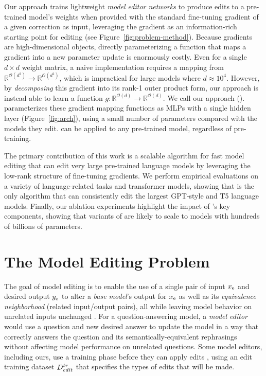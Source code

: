 \documentclass{article}
\begin{document}
Our approach trains lightweight \textit{model editor networks} to produce edits to a pre-trained model's weights when provided with the standard fine-tuning gradient of a given correction as input, leveraging the gradient as an information-rich starting point for editing (see Figure~\ref{fig:problem-method}). Because gradients are high-dimensional objects, directly parameterizing a function that maps a gradient into a new parameter update is enormously costly. Even for a single $d \times d$ weight matrix, a naive implementation requires a mapping from $\mathbb{R}^{\mathcal{O}(d^2)} \rightarrow \mathbb{R}^{\mathcal{O}(d^2)}$, which is impractical for large models where $d\approx 10^4$. However, by \textit{decomposing} this gradient into its rank-1 outer product form, our approach is instead able to learn a function $g:\mathbb{R}^{\mathcal{O}(d)} \rightarrow \mathbb{R}^{\mathcal{O}(d)}$. We call our approach {\fullname} (\name). {\name} parameterizes these gradient mapping functions as MLPs with a single hidden layer (Figure~\ref{fig:arch}), using a small number of parameters compared with the models they edit. {\name} can be applied to any pre-trained model, regardless of pre-training.

The primary contribution of this work is a scalable algorithm for fast model editing that can edit very large pre-trained language models by leveraging the low-rank structure of fine-tuning gradients. We perform empirical evaluations on a variety of language-related tasks and transformer models, showing that {\name} is the only algorithm that can consistently edit the largest GPT-style \citep{radford2019language,gpt-neo,gpt-j} and T5 \citep{2020t5} language models. Finally, our ablation experiments highlight the impact of \name's key components, showing that variants of {\name} are likely to scale to models with hundreds of billions of parameters.

\section{The Model Editing Problem}

The goal of model editing is to enable the use of a single pair of input $x_\text{e}$ and desired output $y_\text{e}$ to alter a \textit{base model}'s output for $x_\text{e}$ as well as its \textit{equivalence neighborhood} (related input/output pairs), all while leaving model behavior on unrelated inputs unchanged \citep{Sinitsin2020Editable,Cao2021EditingFK}. For a question-answering model, a \textit{model editor} would use a question and new desired answer to update the model in a way that correctly answers the question and its semantically-equivalent rephrasings without affecting model performance on unrelated questions. Some model editors, including ours, use a training phase before they can apply edits \citep{Sinitsin2020Editable,Cao2021EditingFK}, using an edit training dataset $D^{tr}_{edit}$ that specifies the types of edits that will be made.
\end{document}
